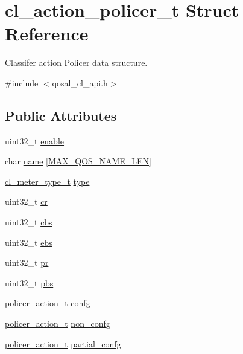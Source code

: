 \hypertarget{structcl__action__policer__t}{\section{cl\-\_\-action\-\_\-policer\-\_\-t Struct Reference}
\label{structcl__action__policer__t}
}


Classifer action Policer data structure.  




{\ttfamily \#include $<$qosal\-\_\-cl\-\_\-api.\-h$>$}

\subsection*{Public Attributes}
\begin{DoxyCompactItemize}
\item 
uint32\-\_\-t \hyperlink{structcl__action__policer__t_a490e11e21624bdd2d9ff1dcbd83947b8}{enable}
\item 
char \hyperlink{structcl__action__policer__t_ab03e04d215ba95b54443f3dc90c9bc30}{name} \mbox{[}\hyperlink{group__FAPI__QOS__CLASS_gacbdea39cbf4ab5d35d49219652c30987}{M\-A\-X\-\_\-\-Q\-O\-S\-\_\-\-N\-A\-M\-E\-\_\-\-L\-E\-N}\mbox{]}
\item 
\hyperlink{group__FAPI__QOS__CLASS_ga320ad61e79289091e97378966fb083b3}{cl\-\_\-meter\-\_\-type\-\_\-t} \hyperlink{structcl__action__policer__t_ab081660ba160894ca6fe330fb23c115f}{type}
\item 
uint32\-\_\-t \hyperlink{structcl__action__policer__t_a6b328b9dd494fa3298e8ef598edb5245}{cr}
\item 
uint32\-\_\-t \hyperlink{structcl__action__policer__t_ade7a7f8d4ae3cb3c3b04ea3a291fd450}{cbs}
\item 
uint32\-\_\-t \hyperlink{structcl__action__policer__t_a622f9bacf5e0490b900e8edc8f9cf05f}{ebs}
\item 
uint32\-\_\-t \hyperlink{structcl__action__policer__t_a8d5e61660df2335c7dbed64b6aa90d9c}{pr}
\item 
uint32\-\_\-t \hyperlink{structcl__action__policer__t_a36a8d678c02da25d3add2aa1036d11d5}{pbs}
\item 
\hyperlink{structpolicer__action__t}{policer\-\_\-action\-\_\-t} \hyperlink{structcl__action__policer__t_aaccf90075204c956c1a3ae1b45f84749}{confg}
\item 
\hyperlink{structpolicer__action__t}{policer\-\_\-action\-\_\-t} \hyperlink{structcl__action__policer__t_ae50ca4ef91d3382c4ac66b5a21672f32}{non\-\_\-confg}
\item 
\hyperlink{structpolicer__action__t}{policer\-\_\-action\-\_\-t} \hyperlink{structcl__action__policer__t_aa54565ed3cc4df7a357337d9857f7829}{partial\-\_\-confg}
\end{DoxyCompactItemize}


